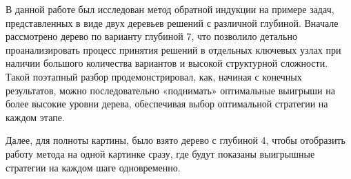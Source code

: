 \conclusion

В данной работе был исследован метод обратной индукции на примере задач, представленных в
виде двух деревьев решений с различной глубиной. Вначале рассмотрено дерево по варианту
глубиной 7, что позволило детально проанализировать процесс принятия решений в отдельных
ключевых узлах при наличии большого количества вариантов и высокой структурной сложности.
Такой поэтапный разбор продемонстрировал, как, начиная с конечных результатов, можно
последовательно «поднимать» оптимальные выигрыши на более высокие уровни дерева,
обеспечивая выбор оптимальной стратегии на каждом этапе.

Далее, для полноты картины, было взято дерево с глубиной 4, чтобы отобразить работу
метода на одной картинке сразу, где будут показаны выигрышные стратегии на каждом шаге
одновременно.
